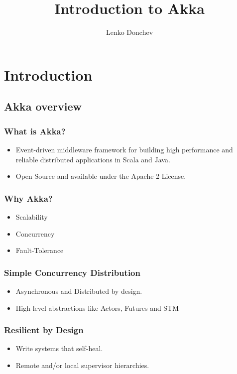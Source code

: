 \documentclass{beamer}
\title{Introduction to Akka}
\author{Lenko Donchev}
\begin{document}
\frame{\titlepage}

\section[Outline]{}
\frame{\tableofcontents}

\section{Introduction}
\subsection{Akka overview}

\frame
    {
      \frametitle{What is Akka?}
      
      \begin{itemize}
      \item Event-driven middleware framework for building high
        performance and reliable distributed applications in Scala and Java.
      \item  Open Source and available under the Apache 2 License.
      \end{itemize}
    }

\frame
    {
      \frametitle{Why Akka?}
      
      \begin{itemize}
      \item Scalability
      \item Concurrency
      \item Fault-Tolerance
      \end{itemize}
    }

\frame
    {
      \frametitle{Simple Concurrency Distribution}

      \begin{itemize}
        \item Asynchronous and Distributed by design.
        \item High-level abstractions like Actors, Futures and STM
      \end{itemize}
    }



\frame
    {
      \frametitle{Resilient by Design}

      \begin{itemize}
        \item Write systems that self-heal. 
        \item Remote and/or local supervisor hierarchies.
      \end{itemize}
    }
\end{document}
